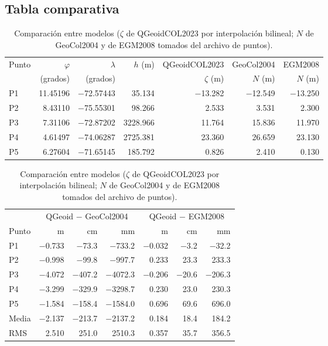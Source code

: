 \documentclass[11pt,letterpaper]{article}
\begin{document}
\subsection{Tabla comparativa}
\begin{table}[H]
\centering
\caption{Comparación entre modelos ($\zeta$ de QGeoidCOL2023 por interpolación bilineal;
$N$ de GeoCol2004 y de EGM2008 tomados del archivo de puntos).}
\label{tab:modelos}
\small
\begin{tabular}{@{}lrrrrrr@{}}
\toprule
Punto & $\varphi$ & $\lambda$ & $h$ (m) & QGeoidCOL2023 & GeoCol2004 & EGM2008 \\
& (grados) & (grados) & & $\zeta$ (m) & $N$ (m) & $N$ (m) \\
\midrule
P1 & \num{11.45196} & \num{-72.57443} & \num{35.134} & \num{-13.282} & \num{-12.549} & \num{-13.250} \\
P2 & \num{8.43110} & \num{-75.55301} & \num{98.266} & \num{2.533} & \num{3.531} & \num{2.300} \\
P3 & \num{7.31106} & \num{-72.87202} & \num{3228.966} & \num{11.764} & \num{15.836} & \num{11.970} \\
P4 & \num{4.61497} & \num{-74.06287} & \num{2725.381} & \num{23.360} & \num{26.659} & \num{23.130} \\
P5 & \num{6.27604} & \num{-71.65145} & \num{185.792} & \num{0.826} & \num{2.410} & \num{0.130} \\
\bottomrule
\end{tabular}

\vspace{0.3cm}
\begin{tabular}{@{}lrrrrrr@{}}
\toprule
& \multicolumn{3}{c}{QGeoid $-$ GeoCol2004} & \multicolumn{3}{c}{QGeoid $-$ EGM2008} \\
\cmidrule(lr){2-4}\cmidrule(l){5-7}
Punto & m & cm & mm & m & cm & mm \\
\midrule
P1 & \num{-0.733} & \num{-73.3} & \num{-733.2} & \num{-0.032} & \num{-3.2} & \num{-32.2} \\
P2 & \num{-0.998} & \num{-99.8} & \num{-997.7} & \num{0.233} & \num{23.3} & \num{233.3} \\
P3 & \num{-4.072} & \num{-407.2} & \num{-4072.3} & \num{-0.206} & \num{-20.6} & \num{-206.3} \\
P4 & \num{-3.299} & \num{-329.9} & \num{-3298.7} & \num{0.230} & \num{23.0} & \num{230.3} \\
P5 & \num{-1.584} & \num{-158.4} & \num{-1584.0} & \num{0.696} & \num{69.6} & \num{696.0} \\
\midrule
Media & \num{-2.137} & \num{-213.7} & \num{-2137.2} & \num{0.184} & \num{18.4} & \num{184.2} \\
RMS & \num{2.510} & \num{251.0} & \num{2510.3} & \num{0.357} & \num{35.7} & \num{356.5} \\
\bottomrule
\end{tabular}
\end{table}
\end{document}
